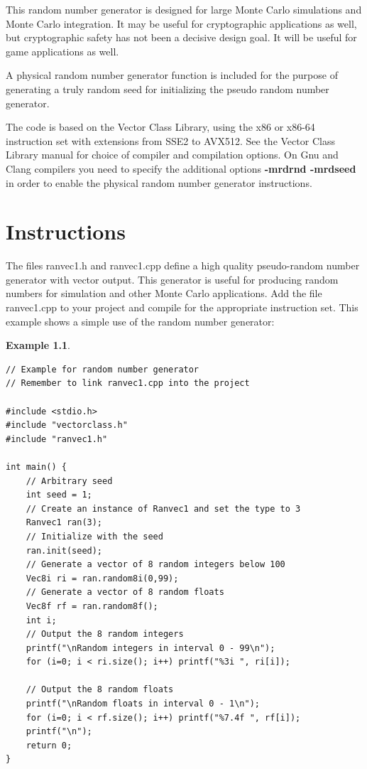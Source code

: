 \documentclass[11pt,a4paper,oneside,openright]{report}
\newtheorem{example}{Example}[chapter]  %
\newcommand{\vspacesmall}{\vspace{3mm}}
\begin{document}
This random number generator is designed for large Monte Carlo simulations and Monte Carlo integration. 
It may be useful for cryptographic applications as well, but cryptographic safety has not been a decisive design goal. It will be useful for game applications as well.
\vspacesmall

A physical random number generator function is included for the purpose of generating a truly random seed for initializing the pseudo random number generator.
\vspacesmall

The code is based on the Vector Class Library, using the x86 or x86-64 instruction set with extensions from SSE2 to AVX512. See the Vector Class Library manual for choice of compiler and compilation options. On Gnu and Clang compilers you need to specify the additional options \textbf{-mrdrnd -mrdseed} in order to enable the physical random number generator instructions.



\chapter{Instructions}\label{chap:Instructions}
\flushleft
The files ranvec1.h and ranvec1.cpp define a high quality pseudo-random number generator with vector output. This generator is useful for producing random numbers for simulation and other Monte Carlo applications. Add the file ranvec1.cpp to your project and compile for the appropriate instruction set. This example shows a simple use of the random number generator:

\begin{example}
\label{exampleRandomGeneration}
\end{example} %
\begin{lstlisting}[frame=single]
// Example for random number generator
// Remember to link ranvec1.cpp into the project

#include <stdio.h>
#include "vectorclass.h"
#include "ranvec1.h"

int main() {
    // Arbitrary seed
    int seed = 1;
    // Create an instance of Ranvec1 and set the type to 3
    Ranvec1 ran(3);
    // Initialize with the seed
    ran.init(seed);
    // Generate a vector of 8 random integers below 100
    Vec8i ri = ran.random8i(0,99);
    // Generate a vector of 8 random floats
    Vec8f rf = ran.random8f();
    int i;
    // Output the 8 random integers
    printf("\nRandom integers in interval 0 - 99\n");
    for (i=0; i < ri.size(); i++) printf("%3i ", ri[i]);
    
    // Output the 8 random floats
    printf("\nRandom floats in interval 0 - 1\n");
    for (i=0; i < rf.size(); i++) printf("%7.4f ", rf[i]);
    printf("\n");
    return 0;
}
\end{lstlisting}
\vspacesmall
\end{document}
